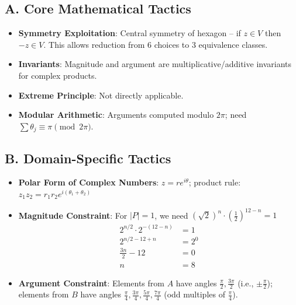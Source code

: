 \documentclass[]{article}
\begin{document}
\begin{tacticalbox}
\subsection*{A. Core Mathematical Tactics}
\begin{itemize}[leftmargin=*]
    \item \textbf{Symmetry Exploitation}: Central symmetry of hexagon -- if $z \in V$ then $-z \in V$. This allows reduction from 6 choices to 3 equivalence classes.
    \item \textbf{Invariants}: Magnitude and argument are multiplicative/additive invariants for complex products.
    \item \textbf{Extreme Principle}: Not directly applicable.
    \item \textbf{Modular Arithmetic}: Arguments computed modulo $2\pi$; need $\sum \theta_j \equiv \pi \pmod{2\pi}$.
\end{itemize}

\subsection*{B. Domain-Specific Tactics}
\begin{itemize}[leftmargin=*]
    \item \textbf{Polar Form of Complex Numbers}: $z = r e^{i\theta}$; product rule: $z_1 z_2 = r_1 r_2 e^{i(\theta_1 + \theta_2)}$
    \item \textbf{Magnitude Constraint}: For $|P| = 1$, we need $(\sqrt{2})^n \cdot (\frac{1}{2})^{12-n} = 1$
        \begin{align*}
            2^{n/2} \cdot 2^{-(12-n)} &= 1\\
            2^{n/2 - 12 + n} &= 2^0\\
            \frac{3n}{2} - 12 &= 0\\
            n &= 8
        \end{align*}
    \item \textbf{Argument Constraint}: Elements from $A$ have angles $\frac{\pi}{2}, \frac{3\pi}{2}$ (i.e., $\pm \frac{\pi}{2}$); elements from $B$ have angles $\frac{\pi}{4}, \frac{3\pi}{4}, \frac{5\pi}{4}, \frac{7\pi}{4}$ (odd multiples of $\frac{\pi}{4}$).
\end{itemize}


\end{tacticalbox}
\end{document}
